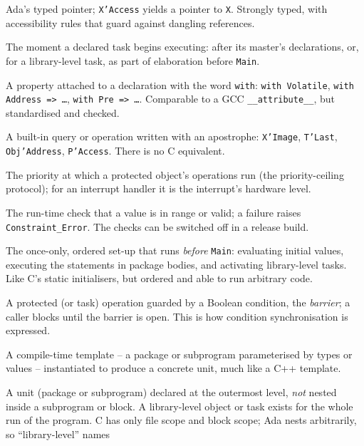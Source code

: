 \begin{description}[style=nextline]
\item[Access type / \texttt{'Access}.] Ada's typed pointer; \texttt{X'Access}
  yields a pointer to \texttt{X}. Strongly typed, with accessibility rules that
  guard against dangling references.
\item[Activation.] The moment a declared task begins executing: after its master's
  declarations, or, for a library-level task, as part of elaboration before
  \texttt{Main}.
\item[Aspect.] A property attached to a declaration with the word \texttt{with}:
  \texttt{with Volatile}, \texttt{with Address => \ldots}, \texttt{with Pre =>
  \ldots}. Comparable to a GCC \texttt{\_\_attribute\_\_}, but standardised and
  checked.
\item[Attribute.] A built-in query or operation written with an apostrophe:
  \texttt{X'Image}, \texttt{T'Last}, \texttt{Obj'Address}, \texttt{P'Access}. There
  is no C equivalent.
\item[Ceiling priority.] The priority at which a protected object's operations
  run (the priority-ceiling protocol); for an interrupt handler it is the
  interrupt's hardware level.
\item[Constraint check / \texttt{Constraint\_Error}.] The run-time check that a
  value is in range or valid; a failure raises \texttt{Constraint\_Error}. The
  checks can be switched off in a release build.
\item[Elaboration.] The once-only, ordered set-up that runs \emph{before}
  \texttt{Main}: evaluating initial values, executing the statements in package
  bodies, and activating library-level tasks. Like C's static initialisers, but
  ordered and able to run arbitrary code.
\item[Entry / barrier.] A protected (or task) operation guarded by a Boolean
  condition, the \emph{barrier}; a caller blocks until the barrier is open. This is
  how condition synchronisation is expressed.
\item[Generic.] A compile-time template -- a package or subprogram parameterised
  by types or values -- instantiated to produce a concrete unit, much like a C++
  template.
\item[Library unit / library-level.] A unit (package or subprogram) declared at
  the outermost level, \emph{not} nested inside a subprogram or block. A
  library-level object or task exists for the whole run of the program. C has only
  file scope and block scope; Ada nests arbitrarily, so ``library-level'' names

\end{description}
